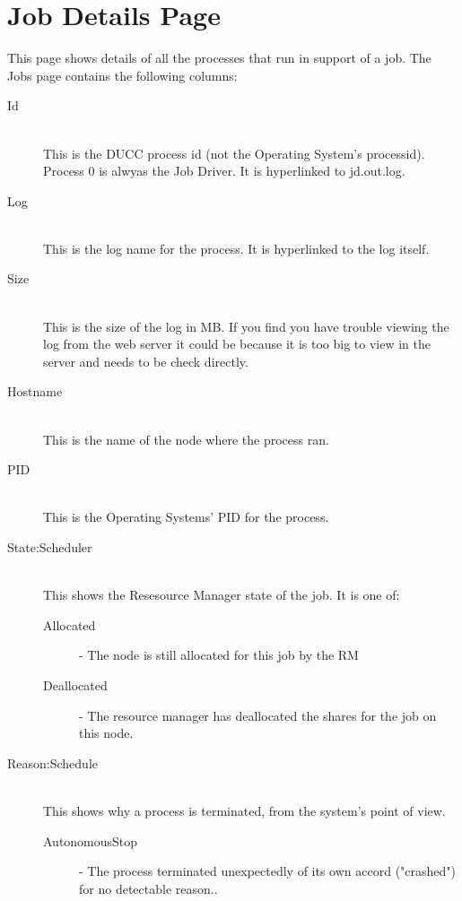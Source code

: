   
    \section{Job Details Page}
    \label{sec:ws-job-details}
    This page shows details of all the processes that run in support of a job. 
    The Jobs page contains the following columns: 

    \begin{description}

        \item[Id] \hfill \\
          This is the DUCC process id (not the Operating System's processid). Process 0 is
          alwyas the Job Driver. It is hyperlinked to jd.out.log.

        \item[Log] \hfill \\
          This is the log name for the process. It is hyperlinked to the log itself.

        \item[Size] \hfill \\
          This is the size of the log in MB. If you find you have trouble viewing the log
          from the web server it could be because it is too big to view in the server and needs to
          be check directly.

        \item[Hostname] \hfill \\
          This is the name of the node where the process ran.

        \item[PID] \hfill \\
          This is the Operating Systems' PID for the process.

        \item[State:Scheduler] \hfill \\
          This shows the Resesource Manager state of the job. It is one of:

          \begin{description}
              \item[Allocated] - The node is still allocated for this job by the RM 
              \item[Deallocated] - The resource manager has deallocated the shares for the job on
                this node.
          \end{description}

        \item[Reason:Schedule] \hfill \\
          This shows why a process is terminated, from the system's point
          of view.
            \begin{description}          
                \item[AutonomousStop] - The process terminated unexpectedly of its own accord ("crashed") for no 
                  detectable reason.. 
                  

\end{description}
\end{description}
